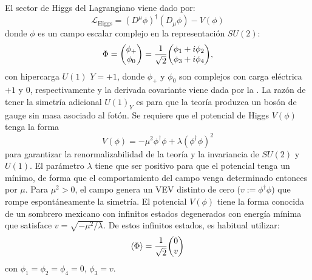 El sector de Higgs del Lagrangiano viene dado por:
\begin{equation}
    \mathcal{L}_{\text{Higgs}} = \left(D^{\mu} \phi\right)^{\dagger} \left(D_{\mu} \phi\right) - V(\phi)
\end{equation}
donde \(\phi\) es un campo escalar complejo en la representación \(SU(2)\):
\begin{equation}
    \Phi = \mqty( \phi_{+} \\ \phi_0 ) = \frac{1}{\sqrt{2}} \mqty(\phi_1 + i \phi_2 \\ \phi_3 + i \phi_4),
\end{equation}
con hipercarga \(U(1)\) \(Y=+1\), donde \(\phi_{+}\) y \(\phi_{0}\) son complejos con carga eléctrica \(+1\) y \(0\), respectivamente y la derivada covariante viene dada por la \Eqn{\ref{eq:theory:sm:mathematical:ew:covariant_derivative}}. La razón de tener la simetría adicional \(U(1)_Y\) es para que la teoría produzca un bosón de gauge sin masa asociado al fotón. Se requiere que el potencial de Higgs \(V(\phi)\) tenga la forma
\begin{equation}
    V(\phi) = -\mu^2 \phi^{\dagger} \phi + \lambda \left(\phi^{\dagger} \phi\right)^2
\end{equation}
para garantizar la renormalizabilidad de la teoría y la invariancia de \(SU(2)\) y \(U(1)\). El parámetro \(\lambda\) tiene que ser positivo para que el potencial tenga un mínimo, de forma que el comportamiento del campo venga determinado entonces por \(\mu\). Para \(\mu^2 > 0\), el campo genera un \ac{VEV} distinto de cero (\(v := \phi^{\dagger} \phi\)) que rompe espontáneamente la simetría. El potencial \(V(\phi)\) tiene la forma conocida de un sombrero mexicano con infinitos estados degenerados con energía mínima que satisface \(v = \sqrt{-\mu^2/\lambda}\). De estos infinitos estados, es habitual utilizar:
\begin{equation}
    \expval{\Phi} = \frac{1}{\sqrt{2}} \mqty(0\\v)
\end{equation}
con \(\phi_1 = \phi_2 = \phi_4 = 0\), \(\phi_3 = v\).

